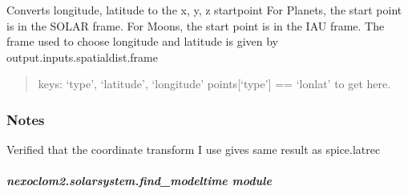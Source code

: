 \documentclass[letterpaper,10pt,english]{sphinxmanual}
\begin{document}
\begin{fulllineitems}
\label{\detokenize{nexoclom2/nexoclom2.solarsystem.coordinate_conversion:nexoclom2.solarsystem.coordinate_conversion.lonlat_to_xyz}}
\pysigstartsignatures
\pysiglinewithargsret
{}
{\sphinxparamcomma {}\sphinxparamcomma {}}
{}
\pysigstopsignatures
\sphinxAtStartPar
Converts longitude, latitude to the x, y, z startpoint
For Planets, the start point is in the SOLAR frame. For Moons, the start
point is in the IAU frame. The frame used to choose longitude and latitude
is given by output.inputs.spatialdist.frame
\begin{quote}\begin{description}
\begin{description}
\sphinxAtStartPar
keys: ‘type’, ‘latitude’, ‘longitude’
points{[}‘type’{]} == ‘lonlat’ to get here.

\end{description}

\begin{description}
\end{description}

\end{description}\end{quote}
\subsubsection*{Notes}

\sphinxAtStartPar
Verified that the coordinate transform I use gives same result as
spice.latrec

\end{fulllineitems}


\sphinxstepscope


\subparagraph{nexoclom2.solarsystem.find\_modeltime module}
\label{\detokenize{nexoclom2/nexoclom2.solarsystem.find_modeltime:module-nexoclom2.solarsystem.find_modeltime}}\label{\detokenize{nexoclom2/nexoclom2.solarsystem.find_modeltime:nexoclom2-solarsystem-find-modeltime-module}}\label{\detokenize{nexoclom2/nexoclom2.solarsystem.find_modeltime::doc}}
\end{document}
